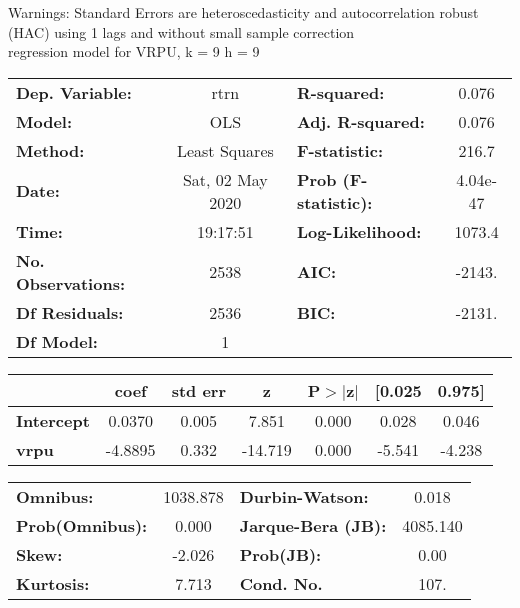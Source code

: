 Warnings: \newline
 [1] Standard Errors are heteroscedasticity and autocorrelation robust (HAC) using 1 lags and without small sample correction\\ 

regression model for VRPU, k = 9 h = 9\begin{center}
\begin{tabular}{lclc}
\toprule
\textbf{Dep. Variable:}    &       rtrn       & \textbf{  R-squared:         } &     0.076   \\
\textbf{Model:}            &       OLS        & \textbf{  Adj. R-squared:    } &     0.076   \\
\textbf{Method:}           &  Least Squares   & \textbf{  F-statistic:       } &     216.7   \\
\textbf{Date:}             & Sat, 02 May 2020 & \textbf{  Prob (F-statistic):} &  4.04e-47   \\
\textbf{Time:}             &     19:17:51     & \textbf{  Log-Likelihood:    } &    1073.4   \\
\textbf{No. Observations:} &        2538      & \textbf{  AIC:               } &    -2143.   \\
\textbf{Df Residuals:}     &        2536      & \textbf{  BIC:               } &    -2131.   \\
\textbf{Df Model:}         &           1      & \textbf{                     } &             \\
\bottomrule
\end{tabular}
\begin{tabular}{lcccccc}
                   & \textbf{coef} & \textbf{std err} & \textbf{z} & \textbf{P$> |$z$|$} & \textbf{[0.025} & \textbf{0.975]}  \\
\midrule
\textbf{Intercept} &       0.0370  &        0.005     &     7.851  &         0.000        &        0.028    &        0.046     \\
\textbf{vrpu}      &      -4.8895  &        0.332     &   -14.719  &         0.000        &       -5.541    &       -4.238     \\
\bottomrule
\end{tabular}
\begin{tabular}{lclc}
\textbf{Omnibus:}       & 1038.878 & \textbf{  Durbin-Watson:     } &    0.018  \\
\textbf{Prob(Omnibus):} &   0.000  & \textbf{  Jarque-Bera (JB):  } & 4085.140  \\
\textbf{Skew:}          &  -2.026  & \textbf{  Prob(JB):          } &     0.00  \\
\textbf{Kurtosis:}      &   7.713  & \textbf{  Cond. No.          } &     107.  \\
\bottomrule
\end{tabular}
\end{center}

